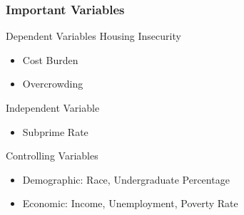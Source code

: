 \documentclass[15pt, aspectratio=169]{beamer}
\begin{document}

\begin{frame}
\frametitle{Important Variables}

\begin{block}{Dependent Variables}
    Housing Insecurity
    \begin{itemize}
        \item Cost Burden
        \item Overcrowding
    \end{itemize}
\end{block}

\begin{block}{Independent Variable}
    \begin{itemize}
        \item Subprime Rate
    \end{itemize}
\end{block}

\begin{block}{Controlling Variables}
    \begin{itemize}
        \item Demographic: Race, Undergraduate Percentage
        \item Economic: Income, Unemployment, Poverty Rate
    \end{itemize}
\end{block}


\end{frame}

\end{document}
